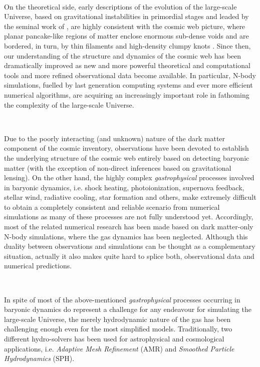 \documentclass[a4,useAMS,usenatbib,usegraphicx,12pt]{article}
\begin{document}
\

On the theoretical side, early descriptions of the evolution of the large-scale 
Universe, based on gravitational instabilities in primordial stages and leaded 
by the seminal work of \citet{Zeldovich70}, are highly consistent with the 
cosmic web picture, where planar pancake-like regions of matter enclose enormous
sub-dense voids and are bordered, in turn, by thin filaments and high-density 
clumpy knots \citep{Bond96}. Since then, our understanding of the structure and 
dynamics of the cosmic web has been dramatically improved as new and more 
powerful theoretical and computational tools and more refined observational data 
become available. In particular, N-body simulations, fuelled by last generation 
computing systems and ever more efficient numerical algorithms, are acquiring 
an increasingly important role in fathoming the complexity of the large-scale 
Universe.

\

Due to the poorly interacting (and unknown) nature of the dark matter component 
of the  cosmic inventory, observations have been devoted to establish the 
underlying structure of the cosmic web entirely based on detecting baryonic 
matter (with the exception of non-direct inferences based on gravitational 
lensing). On the other hand, the highly complex \textit{gastrophysical} 
processes involved in baryonic dynamics, i.e. shock heating, photoionization, 
supernova feedback, stellar wind, radiative cooling, star formation and others, 
make extremely difficult to obtain a completely consistent and reliable scenario 
from numerical simulations as many of these processes are not fully understood 
yet. Accordingly, most of the related numerical research has been made based on 
dark matter-only N-body simulations, where the gas dynamics has been neglected.
Although this duality between observations and simulations can be thought as a 
complementary situation, actually it also makes quite hard to splice both, 
observational data and numerical predictions.

\

In spite of most of the above-mentioned \textit{gastrophysical} processes 
occurring in baryonic dynamics do represent a challenge for any endeavour for 
simulating the large-scale Universe, the merely hydrodynamic nature of the gas
has been challenging enough even for the most simplified models. Traditionally,
two different hydro-solvers has been used for astrophysical and 
cosmological applications, i.e. \textit{Adaptive Mesh Refinement} (AMR) and 
\textit{Smoothed Particle Hydrodynamics} (SPH).
\end{document}
